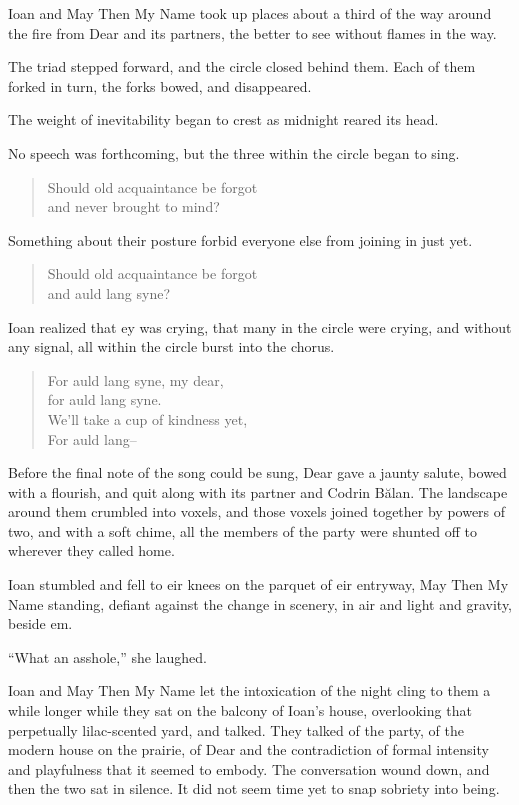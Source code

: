 Ioan and May Then My Name took up places about a third of the way around the fire from Dear and its partners, the better to see without flames in the way.

The triad stepped forward, and the circle closed behind them. Each of them forked in turn, the forks bowed, and disappeared.

The weight of inevitability began to crest as midnight reared its head.

No speech was forthcoming, but the three within the circle began to sing.

\begin{quote}
Should old acquaintance be forgot\\
and never brought to mind?
\end{quote}

Something about their posture forbid everyone else from joining in just yet.

\begin{quote}
Should old acquaintance be forgot\\
and auld lang syne?
\end{quote}

Ioan realized that ey was crying, that many in the circle were crying, and without any signal, all within the circle burst into the chorus.

\begin{quote}
For auld lang syne, my dear,\\
for auld lang syne.\\
We'll take a cup of kindness yet,\\
For auld lang--
\end{quote}

Before the final note of the song could be sung, Dear gave a jaunty salute, bowed with a flourish, and quit along with its partner and Codrin Bălan. The landscape around them crumbled into voxels, and those voxels joined together by powers of two, and with a soft chime, all the members of the party were shunted off to wherever they called home.

Ioan stumbled and fell to eir knees on the parquet of eir entryway, May Then My Name standing, defiant against the change in scenery, in air and light and gravity, beside em.

``What an asshole,'' she laughed.

Ioan and May Then My Name let the intoxication of the night cling to them a while longer while they sat on the balcony of Ioan's house, overlooking that perpetually lilac-scented yard, and talked. They talked of the party, of the modern house on the prairie, of Dear and the contradiction of formal intensity and playfulness that it seemed to embody. The conversation wound down, and then the two sat in silence. It did not seem time yet to snap sobriety into being.


